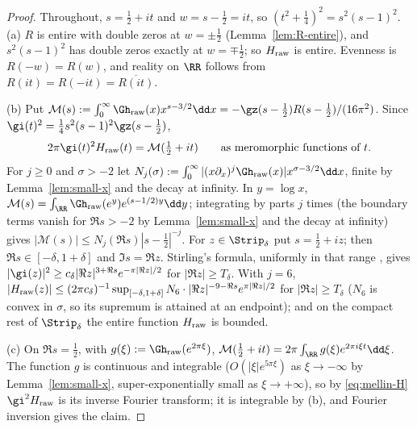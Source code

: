 \begin{proof}
Throughout, $s=\frac12+it$ and $w=s-\frac12=it$, so $(t^2+\frac14)^2=s^2(s-1)^2$.
(a) $R$ is entire with double zeros at $w=\pm\frac12$ (Lemma~\ref{lem:R-entire}), and $s^2(s-1)^2$ has double zeros exactly at $w=\mp\frac12$; so
$H_{\rm raw}$ is entire. Evenness is $R(-w)=R(w)$, and reality on $\RR$ follows from $R(it)=R(-it)=\overline{R(it)}$.

(b) Put $\mathcal M(s):=\int_0^\infty\Gh_{\rm raw}(x)x^{s-3/2}\dd x=-\gz(s-\frac12)R(s-\frac12)/(16\pi^2)$. Since
$\gi(t)^2=\frac14s^2(s-1)^2\gz(s-\frac12)$,
\begin{equation}\label{eq:mellin-H}
2\pi\gi(t)^2H_{\rm raw}(t)=\mathcal M(\tfrac12+it)\qquad\text{as meromorphic functions of }t.
\end{equation}
For $j\ge0$ and $\sigma>-2$ let $N_j(\sigma):=\int_0^\infty|(x\partial_x)^j\Gh_{\rm raw}(x)|x^{\sigma-3/2}\dd x$, finite by Lemma~\ref{lem:small-x} and the
decay at infinity. In $y=\log x$, $\mathcal M(s)=\int_\RR\Gh_{\rm raw}(e^y)e^{(s-1/2)y}\dd y$; integrating by parts $j$ times (the boundary terms vanish
for $\Re s>-2$ by Lemma~\ref{lem:small-x} and the decay at infinity) gives $|\mathcal M(s)|\le N_j(\Re s)|s-\frac12|^{-j}$. For $z\in\Strip_\delta$ put
$s=\frac12+iz$; then $\Re s\in[-\delta,1+\delta]$ and $\Im s=\Re z$. Stirling's formula, uniformly in that range \cite[5.11.9]{DLMF}, gives
$|\gi(z)|^2\ge c_\delta|\Re z|^{3+\Re s}e^{-\pi|\Re z|/2}$ for $|\Re z|\ge T_\delta$. With $j=6$,
$|H_{\rm raw}(z)|\le(2\pi c_\delta)^{-1}\sup_{[-\delta,1+\delta]}N_6\cdot|\Re z|^{-9-\Re s}e^{\pi|\Re z|/2}$ for $|\Re z|\ge T_\delta$ ($N_6$ is convex in $\sigma$, so
its supremum is attained at an endpoint); and on the compact rest of $\Strip_\delta$ the entire function $H_{\rm raw}$ is bounded.

(c) On $\Re s=\frac12$, with $g(\xi):=\Gh_{\rm raw}(e^{2\pi\xi})$, $\mathcal M(\frac12+it)=2\pi\int_\RR g(\xi)e^{2\pi i\xi t}\dd\xi$. The function $g$ is
continuous and integrable ($O(|\xi|e^{5\pi\xi})$ as $\xi\to-\infty$ by Lemma~\ref{lem:small-x}, super-exponentially small as $\xi\to+\infty$), so by
\eqref{eq:mellin-H} $\gi^2H_{\rm raw}$ is its inverse Fourier transform; it is integrable by (b), and Fourier inversion gives the claim.
\end{proof}

